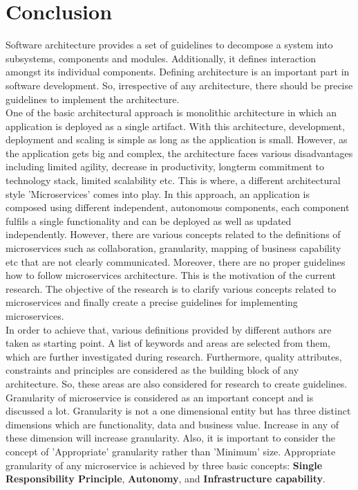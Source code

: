 \chapter{Conclusion}\label{chapter:conclusion}
Software architecture provides a set of guidelines to decompose a system into subsystems, components and modules. Additionally, it defines interaction amongst its individual components. Defining architecture is an important part in software development. So, irrespective of any architecture, there should be precise guidelines to implement the architecture.\\
One of the basic architectural approach is monolithic architecture in which an application is deployed as a single artifact. With this architecture, development, deployment and scaling is simple as long as the application is small. However, as the application gets big and complex, the architecture faces various disadvantages including limited agility, decrease in productivity, longterm commitment to technology stack, limited scalability etc. This is where, a different architectural style 'Microservices' comes into play. In this approach, an application is composed using different independent, autonomous components, each component fulfils a single functionality and can be deployed as well as updated independently. However, there are various concepts related to the definitions of microservices such as collaboration, granularity, mapping of business capability etc that are not clearly communicated. Moreover, there are no proper guidelines how to follow microservices architecture. This is the motivation of the current research. The objective of the research is to clarify various concepts related to microservices and finally create a precise guidelines for implementing microservices.\\
In order to achieve that, various definitions provided by different authors are taken as starting point. A list of keywords and areas are selected from them, which are further investigated during research. Furthermore, quality attributes, constraints and principles are considered as the building block of any architecture. So, these areas are also considered for research to create guidelines.\\
Granularity of microservice is considered as an important concept and is discussed a lot. Granularity is not a one dimensional entity but has three distinct dimensions which are functionality, data and business value. Increase in any of these dimension will increase granularity. Also, it is important to consider the concept of 'Appropriate' granularity rather than 'Minimum' size. Appropriate granularity of any microservice is achieved by three basic concepts: \textbf{Single Responsibility Principle}, \textbf{Autonomy}, and \textbf{Infrastructure capability}.
